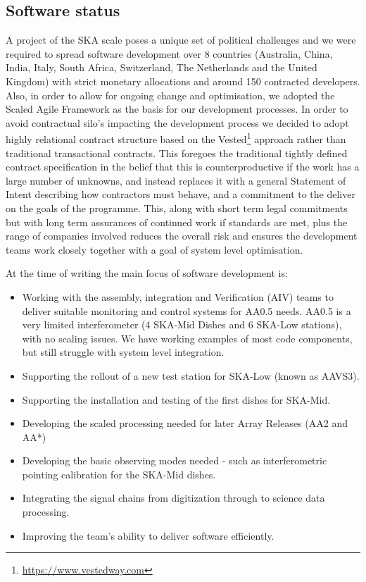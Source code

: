 \documentclass[a4paper,
               biblatex,     %
               keeplastbox,   %
               ]{jacow}
\begin{document}
\subsection{Software status}
A project of the SKA scale poses a unique set of political challenges and we were required to spread software development over 8 countries (Australia, China, India, Italy, South Africa, Switzerland, The Netherlands and the United Kingdom) with strict monetary allocations and around 150 contracted developers. Also, in order to allow for ongoing change and optimisation, we adopted the Scaled Agile Framework as the basis for our development processes. In order to avoid contractual silo's impacting the development process we decided to adopt highly relational contract structure based on the Vested\footnote{\url{https://www.vestedway.com}} approach rather than traditional transactional contracts. This foregoes the traditional tightly defined contract specification in the belief that this is counterproductive if the work has a large number of unknowns, and instead replaces it with a general Statement of Intent describing how contractors must behave, and a commitment to the deliver on the goals of the programme. This, along with short term legal commitments but with long term assurances of continued work if standards are met, plus the range of companies involved reduces the overall risk and ensures the development teams work closely together with a goal of system level optimisation.

At the time of writing the main focus of software development is:
\begin{itemize}
  \item Working with the assembly, integration and Verification (AIV) teams to deliver suitable monitoring and control systems for AA0.5 needs. AA0.5 is a very limited interferometer (4 SKA-Mid Dishes and 6 SKA-Low stations), with no scaling issues. We have working examples of most code components, but still struggle with system level integration. 
  \item Supporting the rollout of a new test station for SKA-Low (known as AAVS3).
  \item Supporting the installation and testing of the first dishes for SKA-Mid.
  \item Developing the scaled processing needed for later Array Releases (AA2 and AA*)
  \item Developing the basic observing modes needed - such as interferometric pointing calibration for the SKA-Mid dishes.
  \item Integrating the signal chains from digitization through to science data processing.
  \item Improving the team's ability to deliver software efficiently.
\end{itemize}
\end{document}
